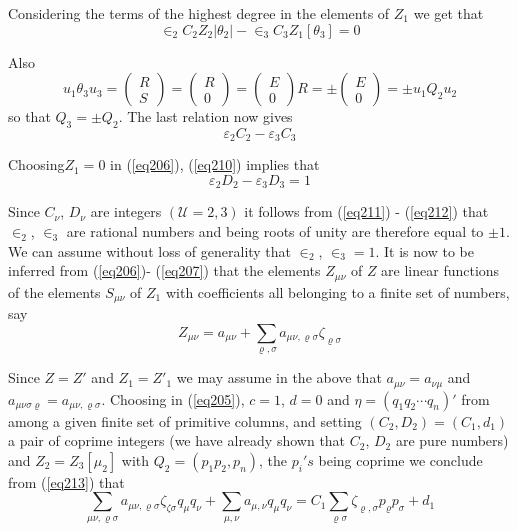  Considering the terms of the highest degree in the elements of $Z_1$
 we get that 
 $$
 \in _2 C_2 Z_2 |\theta_2| - \in_3 C_3 Z_1 [\theta_3]
 = 0 
 $$
 
 Also 
 $$
 u_1 \theta_3 u_3 = \begin{pmatrix} R \\ S \end{pmatrix}
 = \begin{pmatrix} R \\ 0 \end{pmatrix} = \begin{pmatrix} E
   \\ 0 \end{pmatrix} R = \pm \begin{pmatrix} E \\ 0 \end{pmatrix} =
 \pm u_1 Q_2 u_2 
 $$
 so that $Q_3 = \pm Q_2$. The last relation now gives 
 \begin{equation*}
\varepsilon_2 C_2 - \varepsilon_3 C_3  \tag{211}\label{eq211} 
 \end{equation*} 
 
 Choosing\pageoriginale $Z_1 = 0$ in (\ref{eq206}), (\ref{eq210})
 implies that 
 \begin{equation*}
\varepsilon_2 D_2 - \varepsilon_3 D_3 = 1 \tag{212}\label{eq212} 
 \end{equation*} 
 
 Since $C_\nu$, $D_\nu$ are integers $(\mathcal{U}= 2,3)$ it follows
 from (\ref{eq211}) - (\ref{eq212}) that $\in_2$, $\in_3$ are
 rational numbers and being roots of unity are therefore equal to $\pm
 1$. We can assume without loss of generality that $\in_2$,
 $\in_3 = 1$. It is now to be inferred from (\ref{eq206})- (\ref{eq207}) that
 the elements $Z_{\mu \nu}$ of $Z$ are linear functions of the
 elements $S_{\mu \nu} $ of $Z_1$ with coefficients all belonging to a
 finite set of numbers, say 
 \begin{equation*}
Z_{\mu \nu} = a_{\mu \nu} + \sum_{\varrho , \sigma} a _{\mu \nu ,
  \varrho \sigma} \zeta_{\varrho \sigma} \tag{213}\label{eq213}  
 \end{equation*}
 
 Since $Z = Z'$ and $Z_1 = Z'_1$ we may assume in the above that
 $a_{\mu \nu} = a _{\nu \mu}$ and $a_{\mu \nu \sigma \varrho} = a_{\mu
   \nu, \varrho \sigma}$. Choosing in (\ref{eq205}), $c=1$, $d=0$ and $\eta =
 (q_1 q_2 \cdots q_n)'$ from among a given finite set of primitive
 columns, and setting $(C_2 , D_2) = (C_1, d_1)$ a pair of coprime
 integers (we have already shown that $C_2$, $D_2$ are pure numbers)
 and $Z_2 = Z_3 [\mu_2]$ with $Q_2 = (p_1 p_2 , p_n)$,  the $p_i' s$
 being coprime we conclude from (\ref{eq213}) that 
 \begin{equation*}
\sum_{\mu \nu, \varrho \sigma} a_{\mu \nu, \varrho \sigma}
\zeta_{\zeta \sigma} q_{\mu} q_{\nu}  + \sum_{\mu, \nu} a_{\mu, \nu}
q_{\mu} q_{\nu} = C_1 \sum_{\varrho \sigma} \zeta_{\varrho ,
  \sigma}p_{\varrho} p_{\sigma} + d_1 \tag{214}\label{eq214}  
 \end{equation*} 
 
